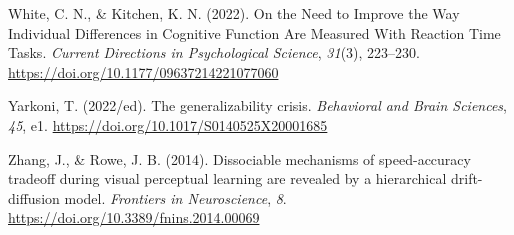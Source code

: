 \documentclass[
  man, donotrepeattitle,floatsintext]{apa6}
\newlength{\cslhangindent}
\newenvironment{CSLReferences}[2] %
 {\begin{list}{}{%
  \setlength{\itemindent}{0pt}
  \setlength{\leftmargin}{0pt}
  \setlength{\parsep}{0pt}
  \ifodd #1
   \setlength{\leftmargin}{\cslhangindent}
   \setlength{\itemindent}{-1\cslhangindent}
  \fi
  \setlength{\itemsep}{#2\baselineskip}}}
 {\end{list}}
\begin{document}
\begin{CSLReferences}{1}{0}
White, C. N., \& Kitchen, K. N. (2022). On the {Need} to {Improve} the {Way Individual Differences} in {Cognitive Function Are Measured With Reaction Time Tasks}. \emph{Current Directions in Psychological Science}, \emph{31}(3), 223--230. \url{https://doi.org/10.1177/09637214221077060}

Yarkoni, T. (2022/ed). The generalizability crisis. \emph{Behavioral and Brain Sciences}, \emph{45}, e1. \url{https://doi.org/10.1017/S0140525X20001685}

Zhang, J., \& Rowe, J. B. (2014). Dissociable mechanisms of speed-accuracy tradeoff during visual perceptual learning are revealed by a hierarchical drift-diffusion model. \emph{Frontiers in Neuroscience}, \emph{8}. \url{https://doi.org/10.3389/fnins.2014.00069}

\end{CSLReferences}
\end{document}
